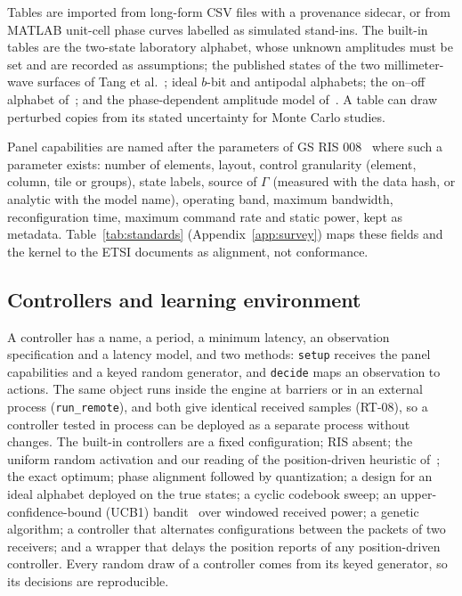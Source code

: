 Tables are imported from long-form CSV files
with a provenance sidecar, or from MATLAB unit-cell phase curves labelled as simulated
stand-ins. The built-in tables are the two-state laboratory alphabet, whose unknown
amplitudes must be set and are recorded as assumptions; the published states of the two
millimeter-wave surfaces of Tang et al.~\cite{Tang2022mmWave}; ideal $b$-bit and antipodal
alphabets; the on--off alphabet of~\cite{Mishra2025WCL}; and the phase-dependent amplitude
model of~\cite{Abeywickrama2020Practical}. A table can draw perturbed copies from its stated
uncertainty for Monte Carlo studies.

Panel capabilities are named after the parameters of GS RIS
008~\cite{ETSI_GS_RIS008} where such a parameter exists: number of elements, layout, control granularity (element, column, tile or
groups), state labels, source of $\Gamma$ (measured with the data hash, or analytic with the
model name), operating band, maximum bandwidth, reconfiguration time, maximum command rate
and static power, kept as metadata. Table~\ref{tab:standards} (Appendix~\ref{app:survey})
maps these fields and the kernel to the ETSI documents as alignment, not conformance.

\subsection{Controllers and learning environment}
A controller
has a name, a period, a minimum latency, an observation specification and a latency model,
and two methods: \texttt{setup} receives the panel capabilities and a keyed random generator,
and \texttt{decide} maps an observation to actions. The same object runs inside the engine at
barriers or in an external process (\texttt{run\_remote}), and both give identical
received samples (RT-08), so a controller tested in process can be deployed as a separate
process without changes. The built-in
controllers are a fixed configuration; RIS absent; the uniform random activation and our
reading of the position-driven heuristic of~\cite{Mishra2025WCL}; the exact optimum; phase
alignment followed by quantization; a design for an ideal alphabet deployed on the true
states; a cyclic codebook sweep; an upper-confidence-bound (UCB1) bandit~\cite{Auer2002UCB}
over windowed received power; a genetic algorithm; a controller that alternates
configurations between the packets of two receivers; and a wrapper that delays the position
reports of any position-driven controller. Every random draw of a controller comes from its
keyed generator, so its decisions are reproducible.

